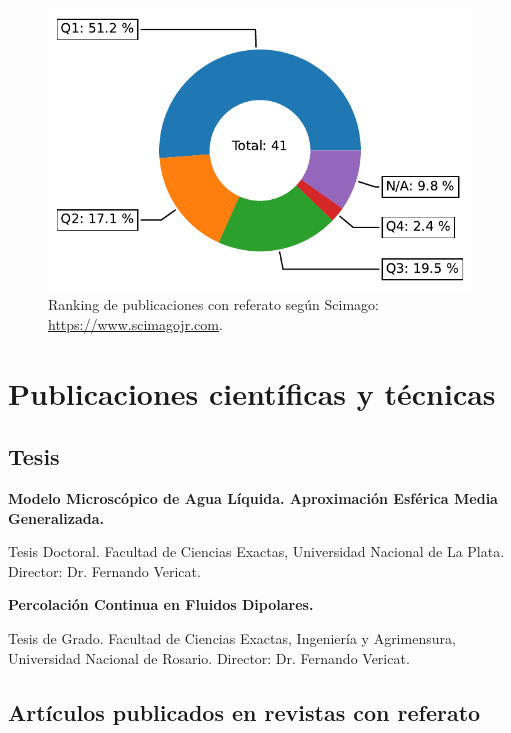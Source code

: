 \begin{figure}
    \vspace{-7em}
    \centering
    \includegraphics[width=0.98\linewidth]{publicaciones_q.pdf}
    \caption*{\tiny Ranking de publicaciones con referato según Scimago: \url{https://www.scimagojr.com}.}
\end{figure}

\section{Publicaciones científicas y técnicas}

\subsection{Tesis}
  \textbf{Modelo Microscópico de Agua Líquida. Aproximación Esférica Media Generalizada.}
 
 Tesis Doctoral. Facultad de Ciencias Exactas, Universidad Nacional de La Plata. Director: Dr. Fernando Vericat. 

 
  \textbf{Percolación Continua en Fluidos Dipolares.}
 
 Tesis de Grado. Facultad de Ciencias Exactas, Ingeniería y Agrimensura, Universidad Nacional de Rosario. Director: Dr. Fernando Vericat.


\subsection{Artículos publicados en revistas con referato}

